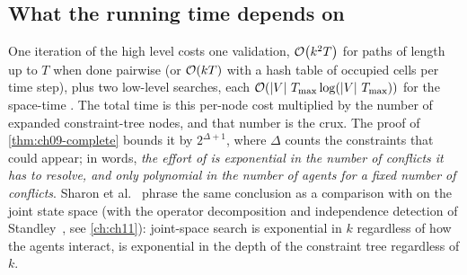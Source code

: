 \subsection{What the running time depends on}
\label{sec:ch09-complexity}

One iteration of the high level costs one validation, $\mathcal{O}\!\left(k^2 T\right)$ for
paths of length up to $T$ when done pairwise (or $\mathcal{O}\!\left(kT\right)$ with a hash
table of occupied cells per time step), plus two low-level searches, each
$\mathcal{O}\!\left(\left\lvert V \right\rvert\,T_{\max} \log(\left\lvert V \right\rvert\,T_{\max})\right)$ for the space-time
\astar. The total time is this per-node cost multiplied by the number of
expanded constraint-tree nodes, and that number is the crux. The proof of
\cref{thm:ch09-complete} bounds it by $2^{\Delta + 1}$, where $\Delta$ counts
the constraints that could appear; in words, \emph{the effort of \cbs is
exponential in the number of conflicts it has to resolve, and only
polynomial in the number of agents for a fixed number of conflicts}.
Sharon et al.~\cite{sharon2015cbs} phrase the same conclusion as a
comparison with \astar on the joint state space (with the operator
decomposition and independence detection of Standley~\cite{standley2010finding},
see \cref{ch:ch11}): joint-space search is exponential in $k$ regardless of
how the agents interact, \cbs is exponential in the depth of the constraint
tree regardless of $k$.

